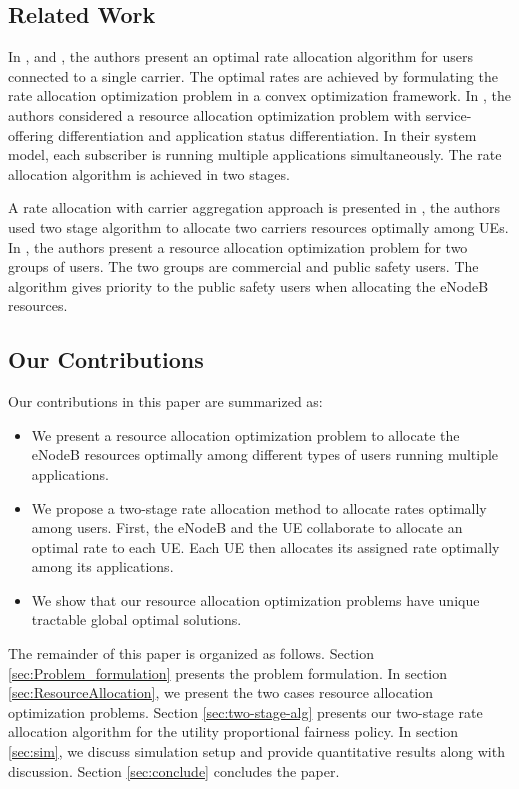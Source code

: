 \documentclass[journal]{IEEEtran} 				\IEEEoverridecommandlockouts 						\usepackage{amsmath,amssymb}
\begin{document}
\subsection{Related Work}\label{sec:related}
In \cite{Ahmed_Utility1}, \cite{Ahmed_Utility2} and \cite{Ahmed_Utility3}, the authors present an optimal rate allocation algorithm for users connected to a single carrier. The optimal rates are achieved by formulating the rate allocation optimization problem in a convex optimization framework. In \cite{Ahmed_Utility3}, the authors considered a resource allocation optimization problem with service-offering differentiation and application status differentiation. In their system model, each subscriber is running multiple applications simultaneously. The rate allocation algorithm is achieved in two stages.

A rate allocation with carrier aggregation approach is presented in \cite{Haya_Utility1}, the authors used two stage algorithm to allocate two carriers resources optimally among UEs. In \cite{Haya_Utility2}, the authors present a resource allocation optimization problem for two groups of users. The two groups are commercial and public safety users. The algorithm gives priority to the public safety users when allocating the eNodeB resources.
\subsection{Our Contributions}\label{sec:contributions}
Our contributions in this paper are summarized as:
\begin{itemize}
\item We present a resource allocation optimization problem to allocate the eNodeB resources optimally among different types of users running multiple applications.
\item We propose a two-stage rate allocation method to allocate rates optimally among users. First, the eNodeB and the UE collaborate to allocate an optimal rate to each UE. Each UE then allocates its assigned rate optimally among its applications.
\item We show that our resource allocation optimization problems have unique tractable global optimal solutions.
\end{itemize}
The remainder of this paper is organized as follows. Section \ref{sec:Problem_formulation} presents the problem formulation. In section \ref{sec:ResourceAllocation}, we present the two cases resource allocation optimization problems. Section \ref{sec:two-stage-alg} presents our two-stage rate allocation algorithm for the utility proportional fairness policy. In section \ref{sec:sim}, we discuss simulation setup and provide quantitative results along with discussion. Section \ref{sec:conclude} concludes the paper.
\end{document}
